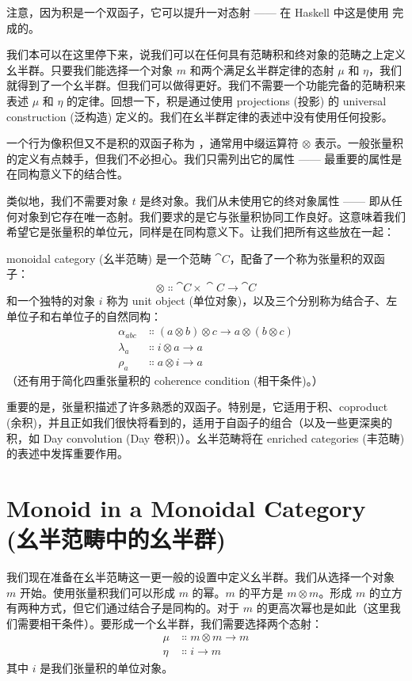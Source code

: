 \noindent
注意，因为积是一个双函子，它可以提升一对态射 —— 在 Haskell 中这是使用  完成的。

我们本可以在这里停下来，说我们可以在任何具有范畴积和终对象的范畴之上定义幺半群。只要我们能选择一个对象 $m$ 和两个满足幺半群定律的态射 $\mu$ 和 $\eta$，我们就得到了一个幺半群。但我们可以做得更好。我们不需要一个功能完备的范畴积来表述 $\mu$ 和 $\eta$ 的定律。回想一下，积是通过使用 projections (投影) 的 universal construction (泛构造) 定义的。我们在幺半群定律的表述中没有使用任何投影。

一个行为像积但又不是积的双函子称为 ，通常用中缀运算符 $\otimes$ 表示。一般张量积的定义有点棘手，但我们不必担心。我们只需列出它的属性 —— 最重要的属性是在同构意义下的结合性。

类似地，我们不需要对象 $t$ 是终对象。我们从未使用它的终对象属性 —— 即从任何对象到它存在唯一态射。我们要求的是它与张量积协同工作良好。这意味着我们希望它是张量积的单位元，同样是在同构意义下。让我们把所有这些放在一起：

monoidal category (幺半范畴) 是一个范畴 $\cat{C}$，配备了一个称为张量积的双函子：
\[\otimes \Colon \cat{C}\times{}\cat{C} \to \cat{C}\]
和一个独特的对象 $i$ 称为 unit object (单位对象)，以及三个分别称为结合子、左单位子和右单位子的自然同构：
\begin{align*}
  \alpha_{a b c} & \Colon (a \otimes b) \otimes c \to a \otimes (b \otimes c) \\
  \lambda_a      & \Colon i \otimes a \to a                                   \\
  \rho_a         & \Colon a \otimes i \to a
\end{align*}
（还有用于简化四重张量积的 coherence condition (相干条件)。）

重要的是，张量积描述了许多熟悉的双函子。特别是，它适用于积、coproduct (余积)，并且正如我们很快将看到的，适用于自函子的组合（以及一些更深奥的积，如 Day convolution (Day 卷积)）。幺半范畴将在 enriched categories (丰范畴) 的表述中发挥重要作用。

\section{Monoid in a Monoidal Category (幺半范畴中的幺半群)}

我们现在准备在幺半范畴这一更一般的设置中定义幺半群。我们从选择一个对象 $m$ 开始。使用张量积我们可以形成 $m$ 的幂。$m$ 的平方是 $m \otimes m$。形成 $m$ 的立方有两种方式，但它们通过结合子是同构的。对于 $m$ 的更高次幂也是如此（这里我们需要相干条件）。要形成一个幺半群，我们需要选择两个态射：
\begin{align*}
  \mu  & \Colon m \otimes m \to m \\
  \eta & \Colon i \to m
\end{align*}
其中 $i$ 是我们张量积的单位对象。

